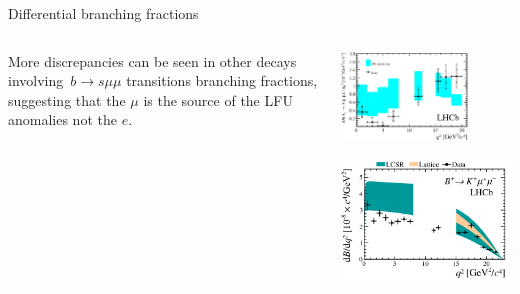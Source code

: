 \documentclass[9pt,usenames,dvipsnames]{beamer}
\begin{document}
\begin{frame} {Differential branching fractions}
	\begin{columns}[c]
More discrepancies can be seen in other decays involving~$ b \to s\mu \mu $ transitions branching fractions, suggesting that the $\mu$ is the source of the LFU anomalies not the $e$.  
		\begin{center}
			\includegraphics[width= 0.75\textwidth]{./assets/figure5} \\ {\tiny {}}  
				\begin{center}
					\includegraphics[width=0.75 \textwidth]{./assets/kmumu_BF} \\ 
				\end{center}
		\end{center}
	\end{columns}
\end{frame}
\end{document}

